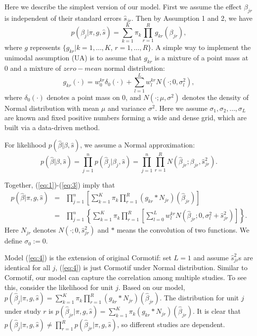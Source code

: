 \documentclass[11pt]{article}
\begin{document}
Here we describe the simplest version of our model. First we assume the effect $\beta_{jr}$ is independent of their standard errors $\hat s_{jr}$. Then by Assumption 1 and 2, we have
\begin{equation}
p(\beta_j|\pi,g,\hat s) = \sum_{k=1}^K\pi_k\prod_{r=1}^R  g_{kr}(\beta_{jr}),
\label{eq:1}
\end{equation}
where $g$ represents $\{g_{kr}|k = 1,\ldots,K$, $r=1,\ldots,R\}$. A simple way to implement the unimodal assumption (UA) is to assume that $g_{kr}$ is a mixture of a point mass at 0 and a mixture of $zero-mean$ normal distribution:
\begin{equation}
g_{kr}(\cdot) =  w_0^{kr}\delta_0(\cdot)+\sum_{l=1}^L w_l^{kr}N(\cdot;0,\sigma_l^2),
\label{eq:2}
\end{equation}
where $\delta_0(\cdot)$ denotes a point mass on 0, and $N(\cdot;\mu,\sigma^2)$ denotes the density of Normal distribution with mean $\mu$ and variance $\sigma^2$. Here we assume  $\sigma_1,\sigma_2,\ldots,\sigma_L$ are known and fixed positive numbers forming a wide and dense grid, which are built via a data-driven method.

For likelihood $p(\hat \beta|\beta,\hat s)$, we assume a Normal approximation:
\begin{equation}
p(\hat \beta|\beta,\hat s) = \prod_{j=1}^np(\hat \beta_j|\beta_j,\hat s) = \prod_{j=1}^n\prod_{r=1}^RN(\hat\beta_{jr};\beta_{jr},\hat s_{jr}^2).
\label{eq:3}
\end{equation}

Together, (\ref{eq:1})-(\ref{eq:3}) imply that 
\begin{eqnarray}
p(\hat\beta|\pi,g,\hat s) &=& \prod_{j=1}^n\left[\sum_{k=1}^K\pi_k\prod_{r=1}^R(g_{kr}*N_{jr})(\hat\beta_{jr})\right] \nonumber \\ 
&=& \prod_{j=1}^n\left\{\sum_{k=1}^K\pi_k\prod_{r=1}^R\left[ \sum_{l=0}^Lw_l^{kr}N(\hat\beta_{jr};0,\sigma_l^2+\hat s_{jr}^2)\right]\right\}.
\label{eq:4}
\end{eqnarray}
Here $N_{jr}$ denotes $N(\cdot;0,\hat s_{jr}^2)$ and $*$ means the convolution of two functions. We define $\sigma_0:=0$.

Model (\ref{eq:4}) is the extension of original Cormotif: set $L=1$ and assume $\hat s_{jr}^2$s are identical for all $j$, (\ref{eq:4}) is just Cormotif under Normal distribution. Similar to Cormotif, our model can capture the correlation among multiple studies. To see this, consider the likelihood for unit $j$. Based on our model, $p(\hat\beta_j|\pi,g,\hat s) = \sum_{k=1}^K\pi_k\prod_{r=1}^R(g_{kr}*N_{jr})(\hat\beta_{jr})$. The distribution for unit $j$ under study $r$ is $p(\hat\beta_{jr}|\pi,g,\hat s) = \sum_{k=1}^K\pi_k(g_{kr}*N_{jr})(\hat\beta_{jr})$. It is clear that $p(\hat\beta_j|\pi,g,\hat s) \neq \prod_{r=1}^Rp(\hat\beta_{jr}|\pi,g,\hat s)$, so different studies are dependent. 
\end{document}
